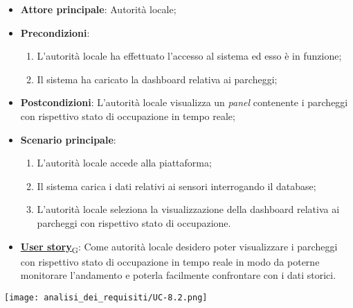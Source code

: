 \begin{itemize}
	\item \textbf{Attore principale}: Autorità locale;
	\item \textbf{Precondizioni}:
	      \begin{enumerate}
		      \item L'autorità locale ha effettuato l'accesso al sistema ed esso è in funzione;
		      \item Il sistema ha caricato la dashboard relativa ai parcheggi;
	      \end{enumerate}
	\item \textbf{Postcondizioni}: L'autorità locale visualizza un \textit{panel} contenente i parcheggi con rispettivo stato di occupazione in tempo reale;
	\item \textbf{Scenario principale}:
	      \begin{enumerate}
		      \item L'autorità locale accede alla piattaforma;
		      \item Il sistema carica i dati relativi ai sensori interrogando il database;
		      \item L'autorità locale seleziona la visualizzazione della dashboard relativa ai parcheggi con rispettivo stato di occupazione.
	      \end{enumerate}
	\item \href{https://7last.github.io/docs/rtb/documentazione-interna/glossario\#user-story}{\textbf{User story}\textsubscript{G}}:
	      Come autorità locale desidero poter visualizzare i parcheggi con rispettivo stato di occupazione in tempo reale in modo da poterne monitorare l'andamento
	      e poterla facilmente confrontare con i dati storici.
\end{itemize}
\begin{center}
	\texttt{[image: analisi\_dei\_requisiti/UC-8.2.png]}
\end{center}

